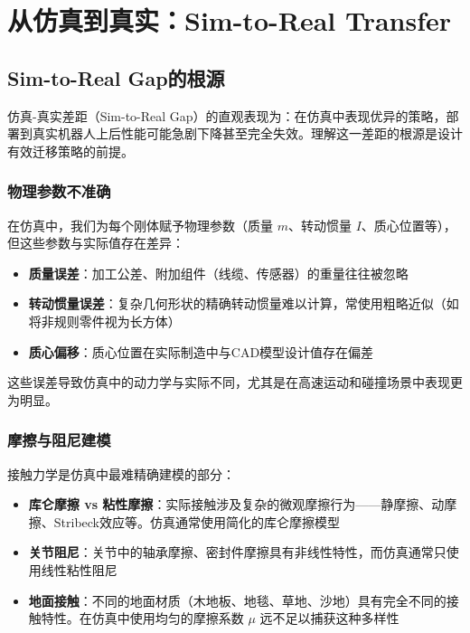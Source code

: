 \chapter{从仿真到真实：Sim-to-Real Transfer}


\section{Sim-to-Real Gap的根源}

仿真-真实差距（Sim-to-Real Gap）的直观表现为：在仿真中表现优异的策略，部署到真实机器人上后性能可能急剧下降甚至完全失效。理解这一差距的根源是设计有效迁移策略的前提。

\subsection{物理参数不准确}

在仿真中，我们为每个刚体赋予物理参数（质量 $m$、转动惯量 $I$、质心位置等），但这些参数与实际值存在差异：

\begin{itemize}
    \item \textbf{质量误差}：加工公差、附加组件（线缆、传感器）的重量往往被忽略
    \item \textbf{转动惯量误差}：复杂几何形状的精确转动惯量难以计算，常使用粗略近似（如将非规则零件视为长方体）
    \item \textbf{质心偏移}：质心位置在实际制造中与CAD模型设计值存在偏差
\end{itemize}

这些误差导致仿真中的动力学与实际不同，尤其是在高速运动和碰撞场景中表现更为明显。

\subsection{摩擦与阻尼建模}

接触力学是仿真中最难精确建模的部分：

\begin{itemize}
    \item \textbf{库仑摩擦 vs 粘性摩擦}：实际接触涉及复杂的微观摩擦行为——静摩擦、动摩擦、Stribeck效应等。仿真通常使用简化的库仑摩擦模型
    \item \textbf{关节阻尼}：关节中的轴承摩擦、密封件摩擦具有非线性特性，而仿真通常只使用线性粘性阻尼
    \item \textbf{地面接触}：不同的地面材质（木地板、地毯、草地、沙地）具有完全不同的接触特性。在仿真中使用均匀的摩擦系数 $\mu$ 远不足以捕获这种多样性
\end{itemize}

